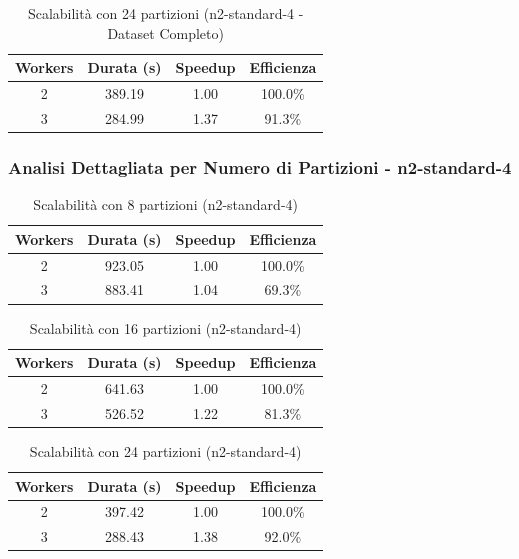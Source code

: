 \documentclass[8pt,a4paper]{article}
\begin{document}
\begin{table}[H]
\centering
\caption{Scalabilità con 24 partizioni (n2-standard-4 - Dataset Completo)}
\begin{tabular}{|c|c|c|c|}
\hline
\textbf{Workers} & \textbf{Durata (s)} & \textbf{Speedup} & \textbf{Efficienza} \\
\hline
2 & 389.19 & 1.00 & 100.0\% \\
3 & 284.99 & 1.37 & 91.3\% \\
\hline
\end{tabular}
\end{table}


\subsubsection{Analisi Dettagliata per Numero di Partizioni - n2-standard-4}

\begin{table}[H]
\centering
\caption{Scalabilità con 8 partizioni (n2-standard-4)}
\begin{tabular}{|c|c|c|c|}
\hline
\textbf{Workers} & \textbf{Durata (s)} & \textbf{Speedup} & \textbf{Efficienza} \\
\hline
2 & 923.05 & 1.00 & 100.0\% \\
3 & 883.41 & 1.04 & 69.3\% \\
\hline
\end{tabular}
\end{table}

\begin{table}[H]
\centering
\caption{Scalabilità con 16 partizioni (n2-standard-4)}
\begin{tabular}{|c|c|c|c|}
\hline
\textbf{Workers} & \textbf{Durata (s)} & \textbf{Speedup} & \textbf{Efficienza} \\
\hline
2 & 641.63 & 1.00 & 100.0\% \\
3 & 526.52 & 1.22 & 81.3\% \\
\hline
\end{tabular}
\end{table}

\begin{table}[H]
\centering
\caption{Scalabilità con 24 partizioni (n2-standard-4)}
\begin{tabular}{|c|c|c|c|}
\hline
\textbf{Workers} & \textbf{Durata (s)} & \textbf{Speedup} & \textbf{Efficienza} \\
\hline
2 & 397.42 & 1.00 & 100.0\% \\
3 & 288.43 & 1.38 & 92.0\% \\
\hline
\end{tabular}
\end{table}
\end{document}
